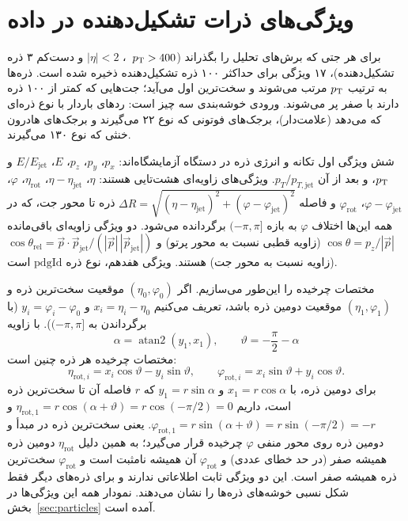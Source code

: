 \section{ویژگی‌های ذرات تشکیل‌دهنده در داده}
\label{app:cons}
برای هر جتی که برش‌های تحلیل را بگذراند ($p_\mathrm{T}>400$~، $|\eta|<2$ و دست‌کم ۳ ذره تشکیل‌دهنده)، ۱۷ ویژگی برای حداکثر ۱۰۰ ذره تشکیل‌دهنده ذخیره شده است. ذره‌ها به ترتیب $p_\mathrm{T}$ مرتب می‌شوند و سخت‌ترین اول می‌آید؛ جت‌هایی که کمتر از ۱۰۰ ذره دارند با صفر پر می‌شوند. ورودی خوشه‌بندی سه چیز است: ردهای باردار با نوع ذره‌ای که  می‌دهد (علامت‌دار)، برجک‌های فوتونی که نوع ۲۲ می‌گیرند و برجک‌های هادرون خنثی که نوع ۱۳۰ می‌گیرند.

شش ویژگی اول تکانه و انرژی ذره در دستگاه آزمایشگاه‌اند: $p_x$، $p_y$، $p_z$، $E$، $E/E_\mathrm{jet}$ و $p_\mathrm{T}$، و بعد از آن $p_T/p_{T,\mathrm{jet}}$. ویژگی‌های زاویه‌ای هشت‌تایی هستند: $\eta$، $\eta-\eta_\mathrm{jet}$، $\eta_\mathrm{rot}$، $\varphi$، $\varphi-\varphi_\mathrm{jet}$، $\varphi_\mathrm{rot}$ و فاصله $\Delta R=\sqrt{(\eta-\eta_\mathrm{jet})^2+(\varphi-\varphi_\mathrm{jet})^2}$ ذره تا محور جت، که در همه این‌ها اختلاف $\varphi$ به بازه $(-\pi,\pi]$ برگردانده می‌شود. دو ویژگی زاویه‌ای باقی‌مانده $\cos\theta=p_z/|\vec p|$ (زاویه قطبی نسبت به محور پرتو) و $\cos\theta_\mathrm{rel}=\vec p\cdot\vec p_\mathrm{jet}/(|\vec p|\,|\vec p_\mathrm{jet}|)$ (زاویه نسبت به محور جت) هستند. ویژگی هفدهم، نوع ذره $\mathrm{pdgId}$ است.

مختصات چرخیده را این‌طور می‌سازیم. اگر $(\eta_0,\varphi_0)$ موقعیت سخت‌ترین ذره و $(\eta_1,\varphi_1)$ موقعیت دومین ذره باشد، تعریف می‌کنیم $x_i=\eta_i-\eta_0$ و $y_i=\varphi_i-\varphi_0$ (با برگرداندن به $(-\pi,\pi]$). با زاویه
\begin{equation}
\alpha=\operatorname{atan2}(y_1,x_1),\qquad \vartheta=-\frac{\pi}{2}-\alpha
\end{equation}
مختصات چرخیده هر ذره چنین است:
\begin{equation}
\eta_{\mathrm{rot},i}=x_i\cos\vartheta-y_i\sin\vartheta,\qquad
\varphi_{\mathrm{rot},i}=x_i\sin\vartheta+y_i\cos\vartheta .
\end{equation}
برای دومین ذره، با $x_1=r\cos\alpha$ و $y_1=r\sin\alpha$ که $r$ فاصله آن تا سخت‌ترین ذره است، داریم $\eta_{\mathrm{rot},1}=r\cos(\alpha+\vartheta)=r\cos(-\pi/2)=0$ و $\varphi_{\mathrm{rot},1}=r\sin(\alpha+\vartheta)=r\sin(-\pi/2)=-r$. یعنی سخت‌ترین ذره در مبدأ و دومین ذره روی محور منفی $\varphi$ چرخیده قرار می‌گیرد؛ به همین دلیل $\eta_\mathrm{rot}$ دومین ذره همیشه صفر (در حد خطای عددی) و $\varphi_\mathrm{rot}$ آن همیشه نامثبت است و $\varphi_\mathrm{rot}$ سخت‌ترین ذره همیشه صفر است. این دو ویژگی ثابت اطلاعاتی ندارند و برای ذره‌های دیگر فقط شکل نسبی خوشه‌های ذره‌ها را نشان می‌دهند. نمودار همه این ویژگی‌ها در بخش~\ref{sec:particles} آمده است.
